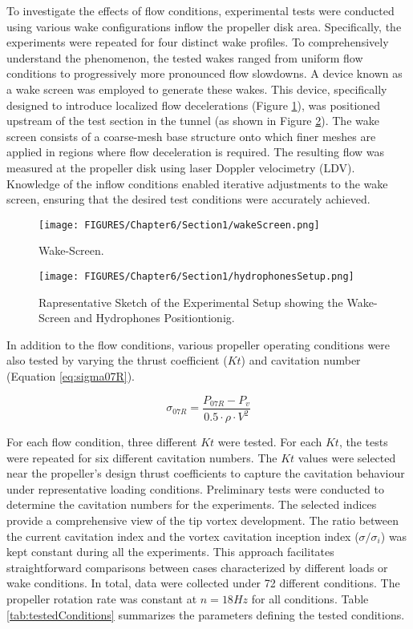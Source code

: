 To investigate the effects of flow conditions, experimental tests were conducted using various wake configurations inflow the propeller disk area. Specifically, the experiments were repeated for four distinct wake profiles. To comprehensively understand the phenomenon, the tested wakes ranged from uniform flow conditions to progressively more pronounced flow slowdowns.
A device known as a wake screen was employed to generate these wakes. This device, specifically designed to introduce localized flow decelerations (Figure \ref{fig:wakeScreen}), was positioned upstream of the test section in the tunnel (as shown in Figure \ref{fig:hydrophonesSetup}). The wake screen consists of a coarse-mesh base structure onto which finer meshes are applied in regions where flow deceleration is required.
The resulting flow was measured at the propeller disk using laser Doppler velocimetry (LDV).
Knowledge of the inflow conditions enabled iterative adjustments to the wake screen, ensuring that the desired test conditions were accurately achieved.

\begin{figure}[h!]
    \centering
    \texttt{[image: FIGURES/Chapter6/Section1/wakeScreen.png]}
    \caption{Wake-Screen.}
    \label{fig:wakeScreen}
\end{figure}

\begin{figure}[h!]
    \centering
    \texttt{[image: FIGURES/Chapter6/Section1/hydrophonesSetup.png]}
    \caption{Rapresentative Sketch of the Experimental Setup showing the Wake-Screen and Hydrophones Positiontionig.}
    \label{fig:hydrophonesSetup}
\end{figure}

In addition to the flow conditions, various propeller operating conditions were also tested by varying the thrust coefficient ($Kt$) and cavitation number (Equation \ref{eq:sigma07R}).

\begin{equation}
    \sigma_{07R} = \frac{P_{07R} - P_v}{0.5 \cdot \rho \cdot V^2}
    \label{eq:sigma07R}
\end{equation}

For each flow condition, three different $Kt$ were tested. For each $Kt$, the tests were repeated for six different cavitation numbers. 
The $Kt$ values were selected near the propeller's design thrust coefficients to capture the cavitation behaviour under representative loading conditions.
Preliminary tests were conducted to determine the cavitation numbers for the experiments. The selected indices provide a comprehensive view of the tip vortex development. The ratio between the current cavitation index and the vortex cavitation inception index ($\sigma/\sigma_i$) was kept constant during all the experiments. This approach facilitates straightforward comparisons between cases characterized by different loads or wake conditions.
In total, data were collected under 72 different conditions. The propeller rotation rate was constant at $n=18 Hz$ for all conditions. Table \ref{tab:testedConditions} summarizes the parameters defining the tested conditions.

